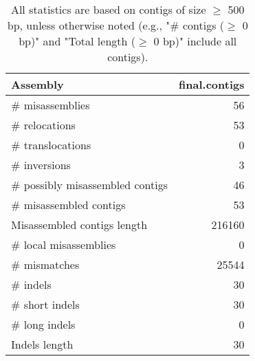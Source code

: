 \documentclass[12pt,a4paper]{article}
\begin{document}
\begin{table}[ht]
\begin{center}
\caption{All statistics are based on contigs of size $\geq$ 500 bp, unless otherwise noted (e.g., "\# contigs ($\geq$ 0 bp)" and "Total length ($\geq$ 0 bp)" include all contigs).}
\begin{tabular}{|l*{1}{|r}|}
\hline
Assembly & final.contigs \\ \hline
\# misassemblies & 56 \\ \hline
\hspace{5mm}\# relocations & 53 \\ \hline
\hspace{5mm}\# translocations & 0 \\ \hline
\hspace{5mm}\# inversions & 3 \\ \hline
\# possibly misassembled contigs & 46 \\ \hline
\# misassembled contigs & 53 \\ \hline
Misassembled contigs length & 216160 \\ \hline
\# local misassemblies & 0 \\ \hline
\# mismatches & 25544 \\ \hline
\# indels & 30 \\ \hline
\hspace{5mm}\# short indels & 30 \\ \hline
\hspace{5mm}\# long indels & 0 \\ \hline
Indels length & 30 \\ \hline
\end{tabular}
\end{center}
\end{table}
\end{document}
